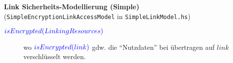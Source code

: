 \textbf{Link Sicherheits-Modellierung (Simple) } (\texttt{SimpleEncryptionLinkAccessModel} in \texttt{SimpleLinkModel.hs})\\


\begin{description}
  \item[${\color{blue}{isEncrypted(LinkingResources)}}$] wo ${\color{blue}{isEncrypted(link)}}$
       gdw. die \enquote{Nutzdaten} bei übertragen auf $link$ verschlüsselt werden.
\end{description} 
